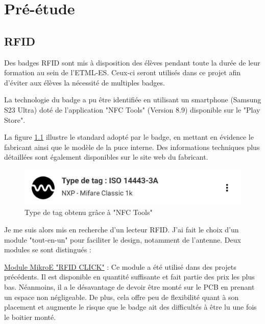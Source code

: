 \cleardoublepage

\chapter{Pré-étude}

\section{RFID}

Des badges RFID sont mis à disposition des élèves pendant toute la durée de leur formation au sein de l'ETML-ES. Ceux-ci seront utilisés dans ce projet afin d'éviter aux élèves la nécessité de multiples badges.

La technologie du badge a pu être identifiée en utilisant un smartphone (Samsung S23 Ultra) doté de l'application "NFC Tools" (Version 8.9) disponible sur le "Play Store".

La figure \ref{fig:screenshotnfctools} illustre le standard adopté par le badge, en mettant en évidence le fabricant ainsi que le modèle de la puce interne. Des informations techniques plus détaillées sont également disponibles sur le site web du fabricant. \cite{MIFAREClassicEV1}

\begin{figure}[h]
	\centering
	\includegraphics[width=0.7\linewidth]{2312_Images/2312_Pre-etude/Screenshot_NFC_Tools}
	\caption{Type de tag obtenu grâce à "NFC Tools"}
	\label{fig:screenshotnfctools}
\end{figure}

Je me suis alors mis en recherche d'un lecteur RFID. J'ai fait le choix d'un module "tout-en-un" pour faciliter le design, notamment de l'antenne. Deux modules se sont distingués : 

\vspace{5pt}
\href{https://www.mikroe.com/rfid-click}{Module MikroE "RFID CLICK"} : Ce module a été utilisé dans des projets précédents. Il est disponible en quantité suffisante et fait partie des prix les plus bas. Néanmoins, il a le désavantage de devoir être monté sur le PCB en prenant un espace non négligeable. De plus, cela offre peu de flexibilité quant à son placement et augmente le risque que le badge ait des difficultés à être lu une fois le boitier monté. 

